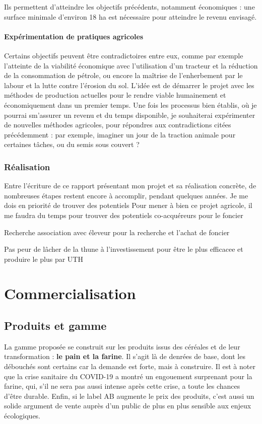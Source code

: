 \documentclass{book}
\begin{document}
Ils permettent d'atteindre les objectifs précédents, notamment économiques : une surface minimale d'environ 18 ha est nécessaire pour atteindre le revenu envisagé.

\subsubsection{Expérimentation de pratiques agricoles}

Certains objectifs peuvent être contradictoires entre eux, comme par exemple l'atteinte de la viabilité économique avec l'utilisation d'un tracteur et la réduction de la consommation de pétrole, ou encore la maîtrise de l'enherbement par le labour et la lutte contre l'érosion du sol. L'idée est de démarrer le projet avec les méthodes de production actuelles pour le rendre viable humainement et économiquement dans un premier temps.  Une fois les processus bien établis, où je pourrai sm'assurer un revenu et du temps disponible, je souhaiterai expérimenter de nouvelles méthodes agricoles, pour répondres aux contradictions citées précédemment : par exemple, imaginer un jour de la traction animale pour certaines tâches, ou du semis sous couvert ?

\subsection{Réalisation}

Entre l'écriture de ce rapport présentant mon projet et sa réalisation concrète, de nombreuses étapes restent encore à accomplir, pendant quelques années. Je me dois en priorité de trouver des potentiels
Pour mener à bien ce projet agricole, il me faudra du temps pour trouver des potentiels co-acquéreurs pour le foncier

Recherche association avec éleveur pour la recherche et l'achat de foncier 


Pas peur de lâcher de la thune à l'investissement pour être le plus efficacee et produire le plus par UTH

\chapter{Commercialisation}

\section{Produits et gamme}

La gamme proposée se construit sur les produits issus des céréales et de leur transformation : \textbf{le pain et la farine}. Il s'agit là de denrées de base, dont les débouchés sont certains car la demande est forte, mais à construire. Il est à noter que la crise sanitaire du COVID-19 a montré un engouement surprenant pour la farine, qui, s'il ne sera pas aussi intense après cette crise, a toute les chances d'être durable. Enfin, si le label AB augmente le prix des produits, c'est aussi un solide argument de vente auprès d'un public de plus en plus sensible aux enjeux écologiques. 
\end{document}
